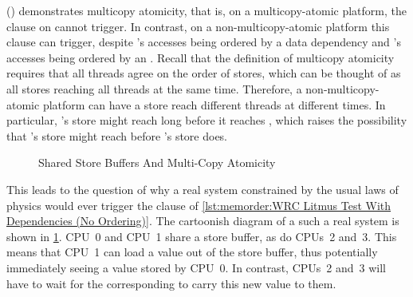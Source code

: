 \begin{fcvref}
()
demonstrates multicopy atomicity, that is, on a multicopy-atomic platform,
the  clause on  cannot trigger.
In contrast, on a non-multicopy-atomic
platform this  clause can trigger, despite
's accesses being ordered by a data dependency and 's
accesses being ordered by an .
Recall that the definition of multicopy atomicity requires that all
threads agree on the order of stores, which can be thought of as
all stores reaching all threads at the same time.
Therefore, a non-multicopy-atomic platform can have a store reach
different threads at different times.
In particular, 's store might reach  long before it
reaches , which raises the possibility that 's store
might reach  before 's store does.
\end{fcvref}

\begin{figure}
\centering
{}
\caption{Shared Store Buffers And Multi-Copy Atomicity}
\label{fig:memorder:Shared Store Buffers And Multi-Copy Atomicity}
\end{figure}

This leads to the question of why a real system constrained by the
usual laws of physics would ever trigger the  clause of
\cref{lst:memorder:WRC Litmus Test With Dependencies (No Ordering)}.
The cartoonish diagram of a such a real system is shown in
\cref{fig:memorder:Shared Store Buffers And Multi-Copy Atomicity}.
CPU~0 and CPU~1 share a store buffer, as do CPUs~2 and~3.
This means that CPU~1 can load a value out of the store buffer, thus
potentially immediately seeing a value stored by CPU~0.
In contrast, CPUs~2 and~3 will have to wait for the corresponding  to carry this new value to them.

\QuickQuizEnd

